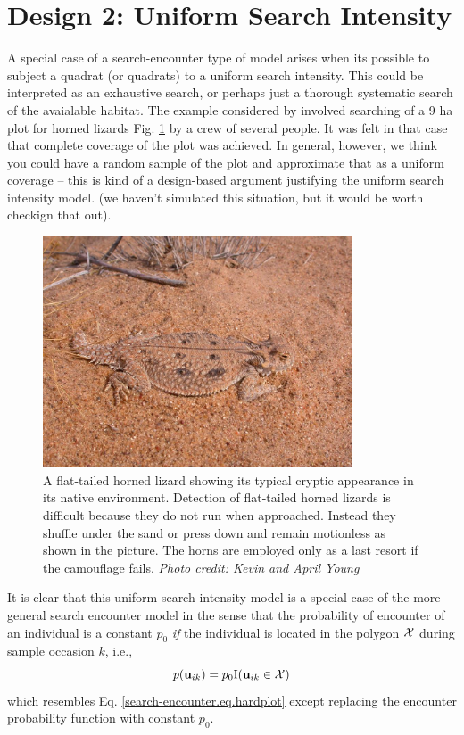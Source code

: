 \section{Design 2: Uniform Search Intensity}

A special case of a search-encounter type of model arises when its
possible to subject a quadrat (or quadrats) to a uniform search
intensity. This could be interpreted as an exhaustive search, or
perhaps just a thorough systematic search of the avaialable habitat.
The example considered by \citet{royle_young:2008} involved searching
of a 9 ha plot for horned lizards Fig.
\ref{searchencounter.fig.hornylizard} by a crew of
several people. It was felt in that case that complete coverage of
the plot was achieved. In general, however, we think you could have
a random sample of the plot and approximate that as a uniform coverage
-- this is kind of a design-based argument justifying the uniform
search intensity model. (we haven't simulated this situation, but it
would be worth checkign that out).

\begin{figure}
\centering
\includegraphics[width=3.6in,height=2.7in]{Ch15-searchencounter/figs/horny_lizard.jpg}
\caption{A flat-tailed horned lizard showing its typical cryptic
  appearance in its native environment.  Detection of flat-tailed
  horned lizards is difficult because they do not run when
  approached. Instead they shuffle under the sand or press down and
  remain motionless as shown in the picture.  The horns are employed
  only as a last resort if the camouflage fails.  {\it Photo credit:
    Kevin and April Young} }
\label{searchencounter.fig.hornylizard}
\end{figure}

It is clear that this uniform search intensity model is a special case
of the more general search encounter model in the sense that the
probability of encounter of an individual is a constant $p_{0}$ {\it
  if} the individual is located in the polygon ${\cal X}$ during
sample occasion $k$, i.e.,
\[
p({\bf u}_{ik}) = p_{0} \mbox{I}({\bf u}_{ik} \in {\cal X})
\]
which resembles Eq. \ref{search-encounter.eq.hardplot} except
replacing the encounter probability function with constant $p_{0}$.

